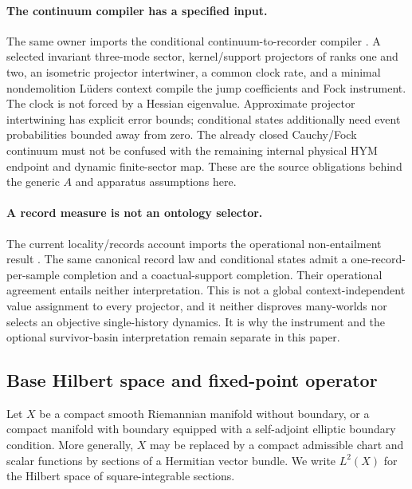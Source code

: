 \documentclass[11pt]{article}
\begin{document}
\paragraph{The continuum compiler has a specified input.}
\label{par:continuum-recorder-consumer}
The same owner imports the conditional continuum-to-recorder compiler
\cite{MTTRecordOwner,ContinuumRecorder}. A selected invariant three-mode
sector, kernel/support projectors of ranks one and two, an isometric
projector intertwiner, a common clock rate, and a minimal nondemolition
L\"uders context compile the jump coefficients and Fock instrument.
The clock is not forced by a Hessian eigenvalue. Approximate projector
intertwining has explicit error bounds; conditional states additionally
need event probabilities bounded away from zero. The already closed
Cauchy/Fock continuum must not be confused with the remaining internal
physical HYM endpoint and dynamic finite-sector map. These are the
source obligations behind the generic \(A\) and apparatus assumptions here.

\paragraph{A record measure is not an ontology selector.}
\label{par:ontology-consumer}
The current locality/records account imports the operational non-entailment
result \cite{MTTLocalityOwner,OntologyNonentailment}. The same canonical
record law and conditional states admit a one-record-per-sample completion
and a coactual-support completion. Their operational agreement entails
neither interpretation. This is not a global context-independent value
assignment to every projector, and it neither disproves many-worlds nor
selects an objective single-history dynamics. It is why the instrument and
the optional survivor-basin interpretation remain separate in this paper.

\subsection{Base Hilbert space and fixed-point operator}
\label{subsec:base-hilbert-space}

Let \(X\) be a compact smooth Riemannian manifold without boundary, or a compact manifold
with boundary equipped with a self-adjoint elliptic boundary condition. More generally, \(X\)
may be replaced by a compact admissible chart and scalar functions by sections of a Hermitian
vector bundle. We write \(L^2(X)\) for the Hilbert space of square-integrable sections.
\end{document}
